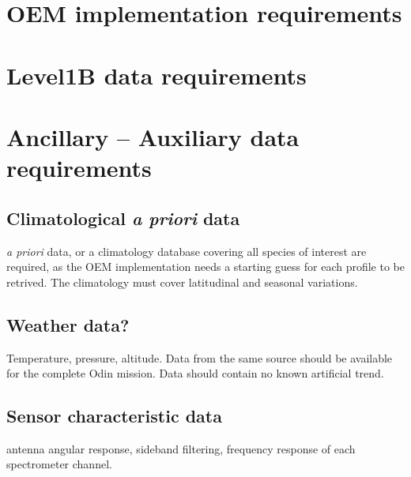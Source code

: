 \section{OEM implementation requirements}


\section{Level1B data requirements}


\section{Ancillary -- Auxiliary data requirements}
\subsection{Climatological \textit{a priori} data}
\textit{a priori} data, or a climatology database covering all species of interest
are required, as the OEM implementation needs a starting guess for each profile
to be retrived. 
The climatology must cover latitudinal and seasonal variations.


\subsection{Weather data?}
Temperature, pressure, altitude. Data from the same source
should be available for the complete Odin mission.
Data should contain no known artificial trend.

\subsection{Sensor characteristic data}  
antenna angular response, sideband filtering,
frequency response of each spectrometer channel.



